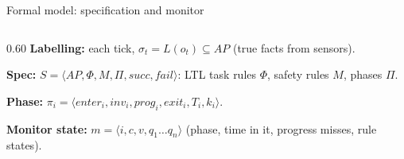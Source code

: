 \documentclass[14pt, aspectratio=169]{beamer}
\begin{document}
\begin{frame}{Formal model: specification and monitor}
    \small
    \setlength{\parskip}{2pt}
    \begin{columns}[c]
        \begin{column}{0.60\textwidth}
            \textbf{Labelling:} each tick, $\sigma_t = L(o_t) \subseteq AP$ (true facts from sensors).

            \textbf{Spec:} $S = \langle AP, \Phi, M, \Pi, \mathit{succ}, \mathit{fail} \rangle$: LTL task rules $\Phi$, safety rules $M$, phases $\Pi$.

            \textbf{Phase:} $\pi_i = \langle \mathit{enter}_i, \mathit{inv}_i, \mathit{prog}_i, \mathit{exit}_i, T_i, k_i \rangle$.

            \textbf{Monitor state:} $m = \langle i, c, v, q_1 \dots q_n \rangle$ (phase, time in it, progress misses, rule states).


\end{column}
\end{columns}
\end{frame}
\end{document}
